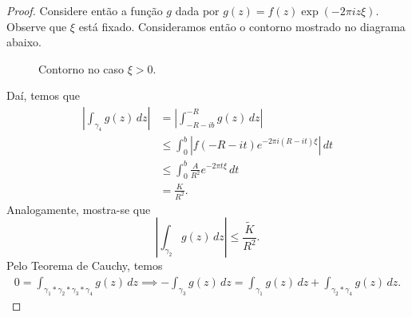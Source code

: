 \begin{proof}
            Considere então a função $g$ dada por $g(z) = f(z)\exp(-2\pi iz\xi)$. Observe que $\xi$
            está fixado. Consideramos então o contorno mostrado no diagrama abaixo.
            \begin{figure}[H]
				\centering 
				\caption{Contorno no caso $\xi > 0$.}
			\end{figure}
            Daí, temos que
            \begin{align*}
                \left|\int_{\gamma_4} g(z) \, dz\right| &= \left|\int_{-R-ib}^{-R} g(z) \, dz\right| \\
                                                        &\leq \int_0^b \left| f(-R-it)e^{-2\pi i(R-it)\xi}
                                                        \right|\, dt \\
                                                        &\leq \int_0^b \frac{A}{R^2}e^{-2\pi t\xi} \, dt \\
                                                        &= \frac{K}{R^2}.
            \end{align*}
            Analogamente, mostra-se que
            \begin{equation*}
                \left|\int_{\gamma_2} g(z) \, dz\right| \leq \frac{\widetilde{K}}{R^2}.
            \end{equation*}
            Pelo Teorema de Cauchy, temos
            \begin{align*}
                0 = \int_{\gamma_1*\gamma_2*\gamma_3*\gamma_4} g(z) \, dz 
                \implies -\int_{\gamma_3} g(z) \, dz = \int_{\gamma_1} g(z) \, dz 
                                                     + \int_{\gamma_2*\gamma_4} g(z) \, dz.

\end{align*}
\end{proof}
